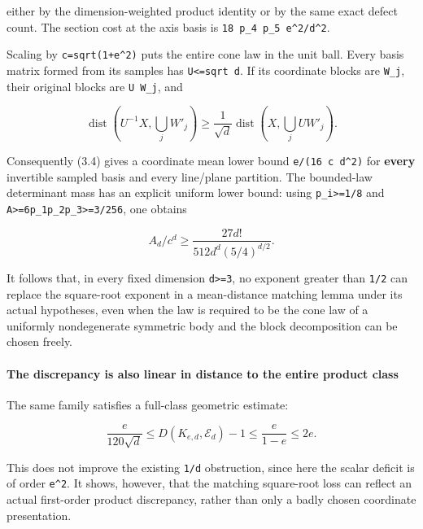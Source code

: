 \documentclass[
  11pt,
]{article}
\begin{document}
either by the dimension-weighted product identity or by the same exact
defect count. The section cost at the axis basis is
\texttt{18\ p\_4\ p\_5\ e\^{}2/d\^{}2}.

Scaling by \texttt{c=sqrt(1+e\^{}2)} puts the entire cone law in the
unit ball. Every basis matrix formed from its samples has
\texttt{\textbar{}\textbar{}U\textbar{}\textbar{}\textless{}=sqrt\ d}.
If its coordinate blocks are \texttt{W\textquotesingle{}\_j}, their
original blocks are \texttt{U\ W\textquotesingle{}\_j}, and

\[
 \operatorname{dist}(U^{-1}X,\bigcup_j W'_j)
 \ge \frac{1}{\sqrt d}
           \operatorname{dist}(X,\bigcup_j UW'_j).
\]

Consequently (3.4) gives a coordinate mean lower bound
\texttt{e/(16\ c\ d\^{}2)} for \textbf{every} invertible sampled basis
and every line/plane partition. The bounded-law determinant mass has an
explicit uniform lower bound: using \texttt{p\_i\textgreater{}=1/8} and
\texttt{A\textgreater{}=6p\_1p\_2p\_3\textgreater{}=3/256}, one obtains

\[
 A_d/c^d\ge
   \frac{27d!}{512d^d(5/4)^{d/2}}. \tag{3.7}
\]

It follows that, in every fixed dimension \texttt{d\textgreater{}=3}, no
exponent greater than \texttt{1/2} can replace the square-root exponent
in a mean-distance matching lemma under its actual hypotheses, even when
the law is required to be the cone law of a uniformly nondegenerate
symmetric body and the block decomposition can be chosen freely.

\paragraph{The discrepancy is also linear in distance to the entire
product
class}\label{the-discrepancy-is-also-linear-in-distance-to-the-entire-product-class}

The same family satisfies a full-class geometric estimate:

\[
 \boxed{\frac{e}{120\sqrt d}
       \le D(K_{e,d},\mathcal E_d)-1
       \le\frac{e}{1-e}\le2e.} \tag{3.8}
\]

This does not improve the existing \texttt{1/d} obstruction, since here
the scalar deficit is of order \texttt{e\^{}2}. It shows, however, that
the matching square-root loss can reflect an actual first-order product
discrepancy, rather than only a badly chosen coordinate presentation.
\end{document}
